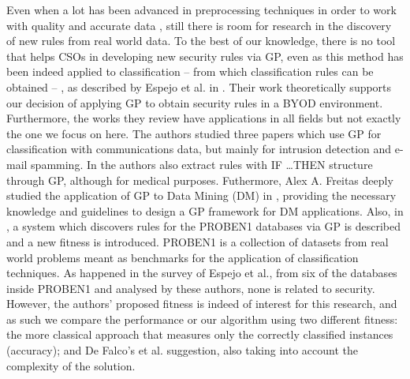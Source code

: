 \documentclass[a4paper,10pt,twocolumn,preprint,3p]{elsarticle}
\begin{document}
Even when a lot has been advanced in preprocessing techniques in order to work with quality and accurate data \cite{han2011data}, still there is room for research in the discovery of new rules from real world data. To the best of our knowledge, there is no tool that helps CSOs in
developing new security rules via GP, %
 even as this method has been
indeed applied to classification -- from which classification rules
can be obtained -- , as described by Espejo et al. in
\cite{espejo2010survey}. Their work theoretically supports our
decision of applying GP to obtain security rules in a BYOD
environment. Furthermore, the works they review have applications in
all fields but not exactly the one we focus on here. The authors
studied three papers which use GP for classification with
communications data, but mainly for intrusion detection and e-mail
spamming. In \cite{Tsakonas2004195} the authors also extract rules with \textsc{IF \ldots THEN} structure through GP, although for medical purposes. Futhermore, Alex A. Freitas deeply studied the application of GP to Data Mining (DM) in \cite{freitas2002data}, providing the necessary knowledge and guidelines to design a GP framework for DM applications. Also, in \cite{DeFalco2002257}, a system which discovers
rules for the PROBEN1 databases via GP is described and a new fitness is introduced. PROBEN1 \cite{prechelt1994proben} is a collection of datasets from real world problems meant as benchmarks for the application of classification techniques. As happened in %
the survey of Espejo et al., from six of the databases inside PROBEN1 and
analysed by these authors, none is related to security. However, the authors' proposed fitness is indeed of interest for this research, and as such we compare the performance or our algorithm using two different fitness: the more classical approach that measures only the correctly classified instances (accuracy); and De Falco's et al. \cite{DeFalco2002257} suggestion, also taking into account the complexity of the solution.  %
\end{document}
